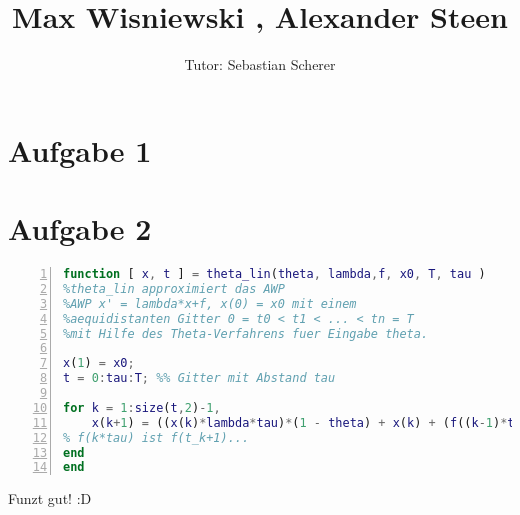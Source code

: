 \documentclass[11pt,a4paper,ngerman]{article}
\author{Tutor: Sebastian Scherer}
\date{}
\title{Max Wisniewski , Alexander Steen}
\begin{document}

\maketitle
\thispagestyle{fancy}



\section*{Aufgabe 1}

\section*{Aufgabe 2}

\begin{lstlisting}[language=matlab, numbers=left]
function [ x, t ] = theta_lin(theta, lambda,f, x0, T, tau )
%theta_lin approximiert das AWP
%AWP x' = lambda*x+f, x(0) = x0 mit einem
%aequidistanten Gitter 0 = t0 < t1 < ... < tn = T
%mit Hilfe des Theta-Verfahrens fuer Eingabe theta.

x(1) = x0;
t = 0:tau:T; %% Gitter mit Abstand tau

for k = 1:size(t,2)-1,
    x(k+1) = ((x(k)*lambda*tau)*(1 - theta) + x(k) + (f((k-1)*tau)*tau)*(1+theta)+ theta*tau*f(k*tau))/(1-tau*lambda*theta);
% f(k*tau) ist f(t_k+1)...
end
end
\end{lstlisting}

Funzt gut! :D

\end{document}
